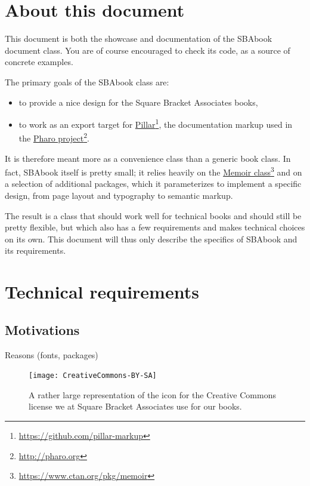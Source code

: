 \documentclass[twoside,openany,showtrims]{sbabook.bod}
\newcommand\hrefnote[3][]{%
  \href{#2}{#3}\footnote{\url{#2} #1}}
\begin{document}
\frontmatter
\pagestyle{plain}

\chapter*{About this document}

This document is both the showcase and documentation of the SBAbook document
class.
You are of course encouraged to check its code, as a source of concrete examples.

The primary goals of the SBAbook class are:
\begin{itemize}
\item to provide a nice design for the Square Bracket Associates books,
\item to work as an export target for
  \hrefnote{https://github.com/pillar-markup}{Pillar}, the documentation markup
  used in the \hrefnote{http://pharo.org}{Pharo project}.
\end{itemize}
It is therefore meant more as a convenience class than a generic book class.
In fact, SBAbook itself is pretty small; it relies heavily on the
\hrefnote{https://www.ctan.org/pkg/memoir}{Memoir class} and on a selection of
additional packages, which it parameterizes to implement a specific design, from
page layout and typography to semantic markup.

The result is a class that should work well for technical books and should still
be pretty flexible, but which also has a few requirements and makes technical
choices on its own.
This document will thus only describe the specifics of SBAbook and its requirements.


\tableofcontents*

\clearpage
\listoffigures

\mainmatter


\chapter{Technical requirements}


\section{Motivations}

Reasons (fonts, packages)

\begin{figure}[tb]
  \caption{A rather large representation of the icon for the Creative Commons
    license we at Square Bracket Associates use for our books.}
  \texttt{[image: CreativeCommons-BY-SA]}
  \label{fig:cc-by-sa-icon}
\end{figure}
\end{document}
